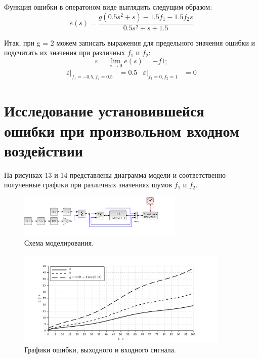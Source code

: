 \documentclass[a4paper, 11pt]{article}
\begin{document}
Функция ошибки в оператоном виде выглядить следущим образом:
\begin{equation}
    e(s) = \frac{g(0.5s^2 + s) - 1.5f_1 - 1.5f_2s}{0.5s^2 + s + 1.5}
\end{equation}
\par
Итак, при g = 2 можем записать выражения для предельного значения ошибки и подсчитать их значения при различных $f_1$ и $f_2$:
\begin{equation}
    \varepsilon = \lim_{s\rightarrow 0}{e(s)} = -f1;
\end{equation}
\begin{align*}
    \varepsilon|_{f_1 = -0.5, f_2 = 0.5} & = 0.5 & \varepsilon|_{f_1 = 0, f_2 = 1} & = 0
\end{align*}

\newpage
\section*{Исследование установившейся ошибки при произвольном входном воздействии}
На рисунках 13 и 14 представлены диаграмма модели и соответственно полученные графики при различных значениях шумов $f_1$ и $f_2$.

\begin{figure}[h!]
    \centering
    \includegraphics[width = 0.7\textwidth]{images/model4.pdf}
    \caption{Схема моделирования.}
\end{figure}
\begin{figure}[h!]
    \centering
    \includegraphics[width = 0.9\textwidth]{images/graph4.pdf}
    \caption{Графики ошибки, выходного и входного сигнала.} 
\end{figure}
\end{document}
